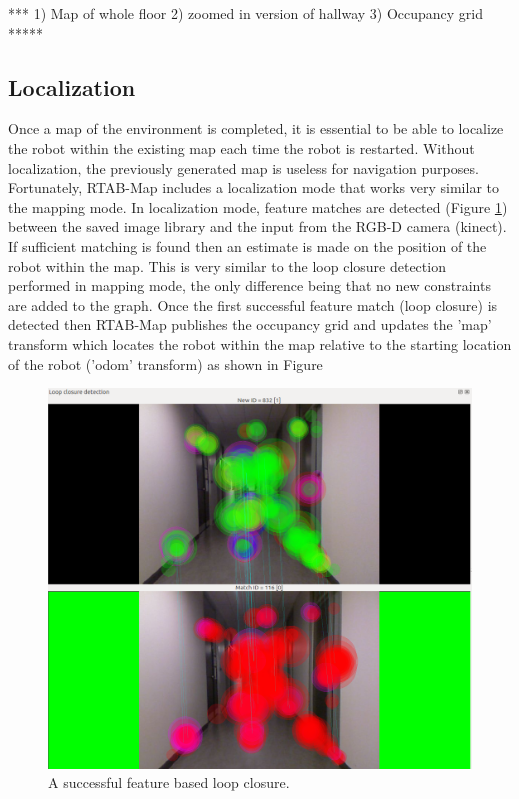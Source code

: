 \documentclass[letterpaper, 10 pt, conference]{ieeeconf}  %
\begin{document}
*** 1) Map of whole floor 2) zoomed in version of hallway 3) Occupancy grid *****

\subsection{Localization}

Once a map of the environment is completed, it is essential to be able to localize the robot within the existing map each time the robot is restarted. Without localization, the previously generated map is useless for navigation purposes. Fortunately, RTAB-Map includes a localization mode that works very similar to the mapping mode. In localization mode, feature matches are detected (Figure \ref{localization}) between the saved image library and the input from the RGB-D camera (kinect). If sufficient matching is found then an estimate is made on the position of the robot within the map. This is very similar to the loop closure detection performed in mapping mode, the only difference being that no new constraints are added to the graph. Once the first successful feature match (loop closure) is detected then RTAB-Map publishes the occupancy grid and updates the 'map' transform which locates the robot within the map relative to the starting location of the robot ('odom' transform) as shown in Figure

	\begin{figure}[!ht]
		\centering
		\includegraphics[width=1.0\columnwidth]{Figures/loop_closure}
		\caption{A successful feature based loop closure.}
		\label{localization}
	\end{figure}
\end{document}
